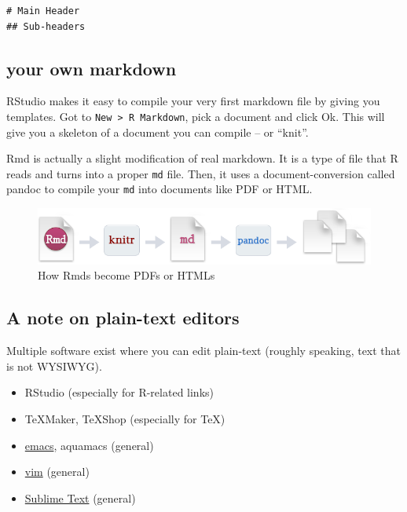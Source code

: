 \documentclass[]{book}
\providecommand{\tightlist}{%
  \setlength{\itemsep}{0pt}\setlength{\parskip}{0pt}}
\theoremstyle{definition}
\theoremstyle{definition}
\theoremstyle{definition}
\theoremstyle{remark}
\begin{document}
\begin{verbatim}
# Main Header
## Sub-headers
\end{verbatim}

\subsection{your own markdown}\label{your-own-markdown}

RStudio makes it easy to compile your very first markdown file by giving
you templates. Got to \texttt{New\ \textgreater{}\ R\ Markdown}, pick a
document and click Ok. This will give you a skeleton of a document you
can compile -- or ``knit''.

Rmd is actually a slight modification of real markdown. It is a type of
file that R reads and turns into a proper \texttt{md} file. Then, it
uses a document-conversion called pandoc to compile your \texttt{md}
into documents like PDF or HTML.

\begin{figure}
\centering
\includegraphics{images/RMarkdownFlow.png}
\caption{How Rmds become PDFs or HTMLs}
\end{figure}

\subsection{A note on plain-text
editors}\label{a-note-on-plain-text-editors}

Multiple software exist where you can edit plain-text (roughly speaking,
text that is not WYSIWYG).

\begin{itemize}
\tightlist
\item
  RStudio (especially for R-related links)
\item
  TeXMaker, TeXShop (especially for TeX)
\item
  \href{https://www.gnu.org/software/emacs/}{emacs}, aquamacs (general)
\item
  \href{http://www.vim.org/download.php}{vim} (general)
\item
  \href{https://www.sublimetext.com}{Sublime Text} (general)
\end{itemize}
\end{document}
